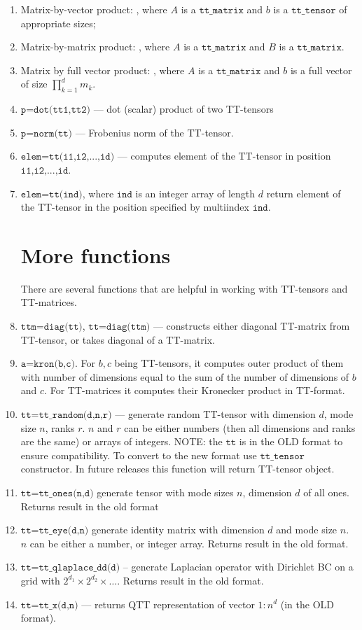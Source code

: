 \documentclass[a4paper,12pt,twoside]{article}
\def\tt{\texttt{tt\_tensor}}
\def\ttm{\texttt{tt\_matrix}}
\begin{document}
\begin{enumerate}
\item Matrix-by-vector product: , where $A$ is a $\ttm$ and $b$ is a $\tt$ of appropriate sizes;
\item Matrix-by-matrix product: , where $A$ is a $\ttm$ and $B$ is a $\ttm$.
\item Matrix by full vector product: , where $A$ is a $\ttm$ and $b$ is a full vector of size $\prod_{k=1}^d m_k$.
\item $\texttt{p=dot(tt1,tt2)}$ --- dot (scalar) product of two TT-tensors
\item $\texttt{p=norm(tt)}$ --- Frobenius norm of the TT-tensor.
\item $\texttt{elem=tt(i1,i2,...,id)}$ --- computes element of the TT-tensor in position $\texttt{i1,i2,...,id}$. 
\item $\texttt{elem=tt(ind)}$, where $\texttt{ind}$ is an integer array of length $d$ return element of the TT-tensor in the position
specified by multiindex $\texttt{ind}$.

\section{More functions}
There are several functions that are helpful in working with TT-tensors and TT-matrices.
\item $\texttt{ttm=diag(tt)}$, $\texttt{tt=diag(ttm)}$ --- constructs either diagonal TT-matrix from TT-tensor, or takes
diagonal of a TT-matrix.
\item $\texttt{a=kron(b,c)}$. For $b,c$ being TT-tensors, it computes outer product of them with number of dimensions equal to the 
sum of the number of dimensions of $b$ and $c$. For TT-matrices it computes their Kronecker product in TT-format.
\item $\texttt{tt=tt\_random(d,n,r)}$ --- generate random TT-tensor with dimension $d$, mode size $n$, ranks $r$. 
$n$ and $r$ can be either numbers (then all dimensions and ranks are the same) or arrays of integers.
NOTE: the $\texttt{tt}$ is in the OLD format to ensure compatibility. To convert to the new format use $\tt$ constructor.
In future releases this function will return TT-tensor object.
\item $\texttt{tt=tt\_ones(n,d)}$ generate tensor with mode sizes $n$, dimension $d$ of all ones. Returns result in the old format
\item $\texttt{tt=tt\_eye(d,n)}$ generate identity matrix with dimension $d$ and mode size $n$. $n$ can be either a number,
or integer array. Returns result in the old format.
\item $\texttt{tt=tt\_qlaplace\_dd(d)}$ -- generate Laplacian operator with Dirichlet BC on a grid with $2^{d_1} \times 2^{d_2} \times \ldots$. 
Returns result in the old format.
\item $\texttt{tt=tt\_x(d,n)}$ --- returns QTT representation of vector $1:n^d$ (in the OLD format).
\end{enumerate}
\end{document}
